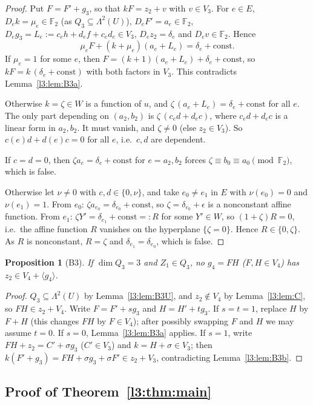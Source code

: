 \documentclass[11pt,a4paper]{article}
\theoremstyle{plain}
\newtheorem{proposition}[theorem]{Proposition}
\theoremstyle{remark}
\newcommand{\F}{\mathbb F_2}
\newcommand{\Lam}{\Lambda^2}
\begin{document}
\begin{proof}
Put $F=F'+g_3$, so that $kF=z_2+v$ with $v\in V_3$. For $e\in E$, $D_ek=\mu_e\in\F$ (as $Q_3\subseteq\Lam(U)$), $D_eF'=a_e\in\F$, $D_eg_3=L_e:=c_eh+d_ef+c_ed_e\in V_3$, $D_ez_2=\delta_e$ and $D_ev\in\F$. Hence
\[
\mu_eF+(k+\mu_e)(a_e+L_e)=\delta_e+\text{const}.
\]
If $\mu_e=1$ for some $e$, then $F=(k+1)(a_e+L_e)+\delta_e+\text{const}$, so $kF=k\,(\delta_e+\text{const})$ with both factors in $V_3$. This contradicts Lemma~\ref{l3:lem:B3a}.

Otherwise $k=\zeta\in W$ is a function of $u$, and $\zeta\,(a_e+L_e)=\delta_e+\text{const}$ for all $e$. The only part depending on $(a_2,b_2)$ is $\zeta\,(c_ed+d_ec)$, where $c_ed+d_ec$ is a linear form in $a_2,b_2$. It must vanish, and $\zeta\neq0$ (else $z_2\in V_3$). So $c(e)d+d(e)c=0$ for all $e$, i.e.\ $c,d$ are dependent.

If $c=d=0$, then $\zeta a_e=\delta_e+\text{const}$ for $e=a_2,b_2$ forces $\zeta\equiv b_0\equiv a_0\pmod{\F}$, which is false.

Otherwise let $\nu\neq0$ with $c,d\in\{0,\nu\}$, and take $e_0\neq e_1$ in $E$ with $\nu(e_0)=0$ and $\nu(e_1)=1$. From $e_0$: $\zeta a_{e_0}=\delta_{e_0}+\text{const}$, so $\zeta=\delta_{e_0}+\epsilon$ is a nonconstant affine function. From $e_1$: $\zeta Y'=\delta_{e_1}+\text{const}=:R$ for some $Y'\in W$, so $(1+\zeta)R=0$, i.e.\ the affine function $R$ vanishes on the hyperplane $\{\zeta=0\}$. Hence $R\in\{0,\zeta\}$. As $R$ is nonconstant, $R=\zeta$ and $\delta_{e_1}=\delta_{e_0}$, which is false.
\end{proof}

\begin{proposition}[B3]\label{l3:prop:B3}
If $\dim Q_3=3$ and $Z_1\in Q_3$, no $g_4=FH$ ($F,H\in V_4$) has $z_2\in V_4+\langle g_4\rangle$.
\end{proposition}

\begin{proof}
$Q_3\subseteq\Lam(U)$ by Lemma~\ref{l3:lem:B3U}, and $z_2\notin V_4$ by Lemma~\ref{l3:lem:C}, so $FH\in z_2+V_4$. Write $F=F'+sg_3$ and $H=H'+tg_3$. If $s=t=1$, replace $H$ by $F+H$ (this changes $FH$ by $F\in V_4$); after possibly swapping $F$ and $H$ we may assume $t=0$. If $s=0$, Lemma~\ref{l3:lem:B3a} applies. If $s=1$, write $FH+z_2=C'+\sigma g_3$ ($C'\in V_3$) and $k=H+\sigma\in V_3$; then $k(F'+g_3)=FH+\sigma g_3+\sigma F'\in z_2+V_3$, contradicting Lemma~\ref{l3:lem:B3b}.
\end{proof}

\subsection[Proof of the three-linear-gate theorem]{Proof of Theorem~\ref{l3:thm:main}}\label{l3:sec:proof}
\end{document}
